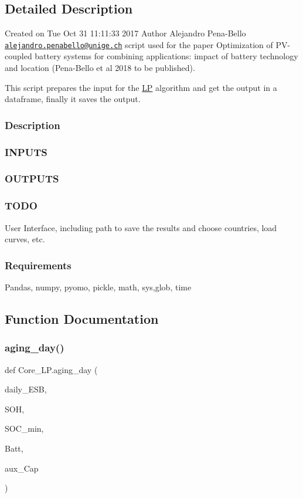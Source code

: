 \subsection{Detailed Description}
Created on Tue Oct 31 11\+:11\+:33 2017 Author Alejandro Pena-\/\+Bello \href{mailto:alejandro.penabello@unige.ch}{\tt alejandro.\+penabello@unige.\+ch} script used for the paper Optimization of P\+V-\/coupled battery systems for combining applications\+: impact of battery technology and location (Pena-\/\+Bello et al 2018 to be published). 

This script prepares the input for the \mbox{\hyperlink{namespace_l_p}{LP}} algorithm and get the output in a dataframe, finally it saves the output. \subsubsection*{Description }

\subsubsection*{I\+N\+P\+U\+TS }

\subsubsection*{O\+U\+T\+P\+U\+TS }

\subsubsection*{T\+O\+DO }

User Interface, including path to save the results and choose countries, load curves, etc. \subsubsection*{Requirements }

Pandas, numpy, pyomo, pickle, math, sys,glob, time 

\subsection{Function Documentation}
\mbox{\label{namespace_core___l_p_ae2add554ee7eb6419d9ec5e4fa2c7b96}} 
\subsubsection{\texorpdfstring{aging\+\_\+day()}{aging\_day()}}
{\footnotesize\ttfamily def Core\+\_\+\+L\+P.\+aging\+\_\+day (\begin{DoxyParamCaption}\item[{}]{daily\+\_\+\+E\+SB,  }\item[{}]{S\+OH,  }\item[{}]{S\+O\+C\+\_\+min,  }\item[{}]{Batt,  }\item[{}]{aux\+\_\+\+Cap }\end{DoxyParamCaption})}

